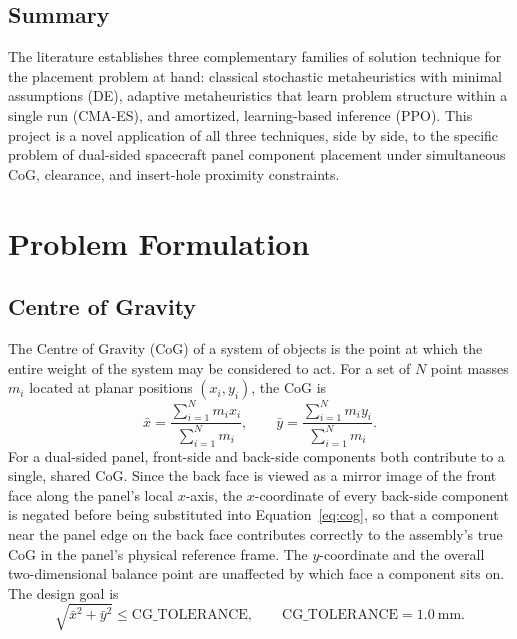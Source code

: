 \documentclass[11pt,a4paper,oneside]{report}
\begin{document}
\section{Summary}
The literature establishes three complementary families of solution technique for the placement problem at hand: classical stochastic metaheuristics with minimal assumptions (DE), adaptive metaheuristics that learn problem structure within a single run (CMA-ES), and amortized, learning-based inference (PPO). This project is a novel application of all three techniques, side by side, to the specific problem of dual-sided spacecraft panel component placement under simultaneous CoG, clearance, and insert-hole proximity constraints.

\chapter{Problem Formulation}
\label{chap:formulation}

\section{Centre of Gravity}
\label{sec:cog}
The Centre of Gravity (CoG) of a system of objects is the point at which the entire weight of the system may be considered to act. For a set of $N$ point masses $m_i$ located at planar positions $(x_i, y_i)$, the CoG is
\begin{equation}
\bar{x} = \frac{\sum_{i=1}^{N} m_i x_i}{\sum_{i=1}^{N} m_i}, \qquad
\bar{y} = \frac{\sum_{i=1}^{N} m_i y_i}{\sum_{i=1}^{N} m_i}.
\label{eq:cog}
\end{equation}
For a dual-sided panel, front-side and back-side components both contribute to a single, shared CoG. Since the back face is viewed as a mirror image of the front face along the panel's local $x$-axis, the $x$-coordinate of every back-side component is negated before being substituted into Equation~\ref{eq:cog}, so that a component near the panel edge on the back face contributes correctly to the assembly's true CoG in the panel's physical reference frame. The $y$-coordinate and the overall two-dimensional balance point are unaffected by which face a component sits on. The design goal is
\begin{equation}
\sqrt{\bar{x}^2 + \bar{y}^2} \le \text{CG\_TOLERANCE}, \qquad \text{CG\_TOLERANCE} = 1.0~\text{mm}.
\end{equation}
\end{document}

